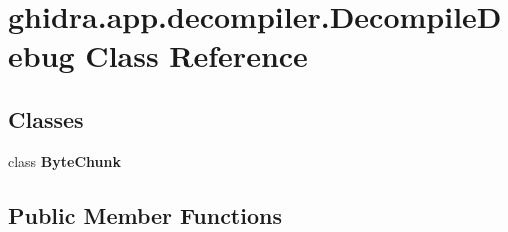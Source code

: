 \hypertarget{classghidra_1_1app_1_1decompiler_1_1_decompile_debug}{}\section{ghidra.\+app.\+decompiler.\+Decompile\+Debug Class Reference}
\label{classghidra_1_1app_1_1decompiler_1_1_decompile_debug}
\subsection*{Classes}
\begin{DoxyCompactItemize}
\item 
class {\bfseries Byte\+Chunk}
\end{DoxyCompactItemize}
\subsection*{Public Member Functions}
